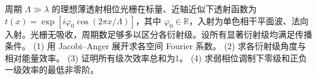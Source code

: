 周期 \(\Lambda\gg\lambda\) 的理想薄透射相位光栅在标量、近轴近似下透射函数为 \(t(x)=\exp[i\varphi_0\cos(2\pi x/\Lambda)]\)，其中 \(\varphi_0\in\mathbb R\)，入射为单色相干平面波、法向入射。光栅无吸收，周期数足够多以区分各衍射级。设所有显著衍射级均满足传播条件。
(1) 用 Jacobi--Anger 展开求各空间 Fourier 系数。
(2) 求各衍射级角度与相对能量效率。
(3) 证明所有级次效率总和为1。
(4) 求弱相位调制下零级和正负一级效率的最低非零阶。

